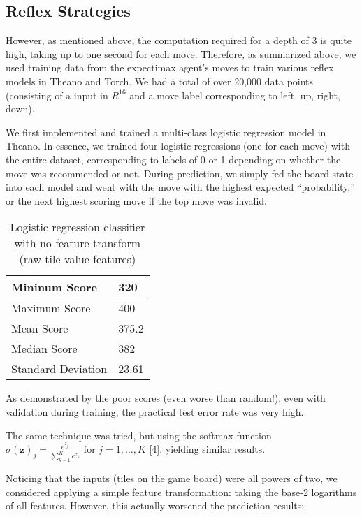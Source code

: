 \documentclass[9pt,twocolumn]{article}
\begin{document}
\subsection{Reflex Strategies}

However, as mentioned above, the computation required for a depth of 3 is quite high, taking up to one second for each move. Therefore, as summarized above, we used training data from the expectimax agent’s moves to train various reflex models in Theano and Torch. We had a total of over 20,000 data points (consisting of a input in $R^{16}$ and a move label corresponding to left, up, right, down). 

We first implemented and trained a multi-class logistic regression model in Theano. In essence, we trained four logistic regressions (one for each move) with the entire dataset, corresponding to labels of 0 or 1 depending on whether the move was recommended or not. During prediction, we simply fed the board state into each model and went with the move with the highest expected “probability,” or the next highest scoring move if the top move was invalid. 

\begin{table}[!htbp]

\centering

\begin{tabular}{|l|l|}
\hline
Mininum Score      & 320 \\ \hline
Maximum Score      & 400 \\ \hline
Mean Score         & 375.2 \\ \hline
Median Score       & 382 \\ \hline
Standard Deviation & 23.61 \\ \hline
\end{tabular}

\caption{Logistic regression classifier with no feature transform (raw tile value features)}

\end{table}

As demonstrated by the poor scores (even worse than random!), even with validation during training, the practical test error rate was very high. 

The same technique was tried, but using the softmax function $\sigma(\mathbf{z})_j = \frac{e^{z_j}}{\sum_{k=1}^K e^{z_k}} \text{ for } j = 1, \dots, K$ [4], yielding similar results. 

Noticing that the inputs (tiles on the game board) were all powers of two, we considered applying a simple feature transformation: taking the base-2 logarithms of all features. However, this actually worsened the prediction results:
\end{document}

